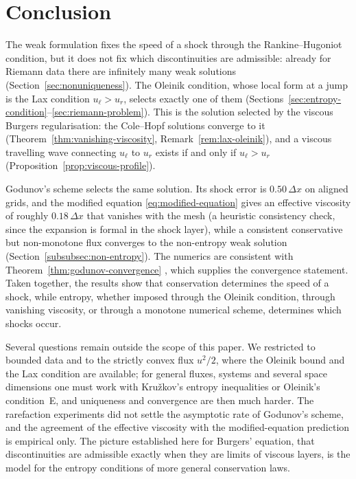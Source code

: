\section{Conclusion}
\label{sec:conclusion}

The weak formulation fixes the speed of a shock through the Rankine--Hugoniot
condition, but it does not fix which discontinuities are admissible: already for
Riemann data there are infinitely many weak solutions
(Section~\ref{sec:nonuniqueness}). The Oleinik condition, whose local form at a
jump is the Lax condition $u_\ell>u_r$, selects exactly one of them
(Sections~\ref{sec:entropy-condition}--\ref{sec:riemann-problem}). This is the
solution selected by the viscous Burgers regularisation: the Cole--Hopf solutions
converge to it (Theorem~\ref{thm:vanishing-viscosity},
Remark~\ref{rem:lax-oleinik}), and a viscous travelling wave connecting $u_\ell$
to $u_r$ exists if and only if $u_\ell>u_r$
(Proposition~\ref{prop:viscous-profile}).

Godunov's scheme selects the same solution. Its shock error is $0.50\,\Delta x$
on aligned grids, and the modified equation \eqref{eq:modified-equation} gives an
effective viscosity of roughly $0.18\,\Delta x$ that vanishes with the mesh (a
heuristic consistency check, since the expansion is formal in the shock layer), while a
consistent conservative but non-monotone flux converges to the non-entropy weak
solution (Section~\ref{subsubsec:non-entropy}). The numerics are consistent with
Theorem~\ref{thm:godunov-convergence} \cite{crandall1980}, which supplies the
convergence statement. Taken together, the results show that conservation
determines the speed of a shock, while entropy, whether imposed through the
Oleinik condition, through vanishing viscosity, or through a monotone numerical
scheme, determines which shocks occur.

Several questions remain outside the scope of this paper. We restricted to
bounded data and to the strictly convex flux $u^2/2$, where the Oleinik bound and
the Lax condition are available; for general fluxes, systems and several space
dimensions one must work with Kru\v{z}kov's entropy inequalities or Oleinik's
condition~E, and uniqueness and convergence are then much harder. The rarefaction
experiments did not settle the asymptotic rate of Godunov's scheme, and the
agreement of the effective viscosity with the modified-equation prediction is
empirical only. The picture established here for Burgers' equation, that
discontinuities are admissible exactly when they are limits of viscous layers, is
the model for the entropy conditions of more general conservation laws.